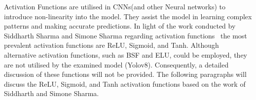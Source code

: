 Activation Functions are utilised in CNNs(and other Neural networks) to introduce non-linearity into the model.
They assist the model in learning complex patterns and making accurate predictions.
 In light of the work conducted by Siddharth Sharma and Simone Sharma regarding  activation functions~\cite{sharma2017activation}
the most prevalent  activation functions are ReLU, Sigmoid, and Tanh.
Although alternative activation functions, such as BSF and ELU, could be employed, they are not utilised by the examined model (Yolov8).
Consequently, a detailed discussion of these functions will not be provided.
The following paragraphs  will discuss the ReLU, Sigmoid, and Tanh activation functions based on the work of Siddharth and Simone Sharma\cite{sharma2017activation}.


\begin{figure}[h!]
    \centering



\end{figure}

